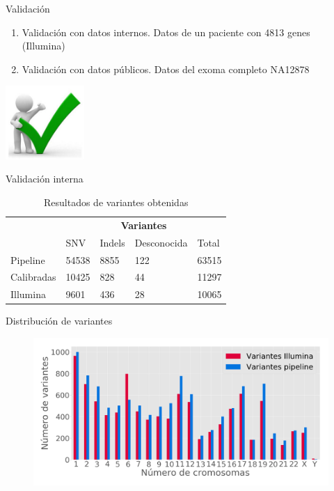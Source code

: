 \documentclass[xcolor=dvipsnames]{beamer}
\begin{document}
\begin{frame}{Validación}
	
	\begin{enumerate}[1.]
		\item Validación con datos internos. Datos de un paciente con 4813 genes (Illumina)
		\item Validación con datos públicos. Datos del exoma completo NA12878
	\end{enumerate}
	\centering
	\includegraphics[width=30mm]{validacion.png}
	
\end{frame}

\begin{frame}{Validación interna}
\begin{table}[h!]
	\centering
	\footnotesize
	\begin{table}[]
		\begin{tabular}{l|l|l|l|l|}
			\cline{2-5}
			& \multicolumn{4}{c|}{\textbf{Variantes}} \\ \cline{2-5} 
			& SNV    & Indels  & Desconocida  & Total \\ \hline
			\multicolumn{1}{|l|}{Pipeline}   & 54538  & 8855    & 122          & 63515 \\ \hline
			\multicolumn{1}{|l|}{Calibradas} & 10425  & 828     & 44           & 11297 \\ \hline
			\multicolumn{1}{|l|}{Illumina}   & 9601   & 436     & 28           & 10065 \\ \hline
		\end{tabular}
	\end{table}
	\caption{Resultados de variantes obtenidas}
\end{table}
\end{frame}

\begin{frame}{Distribución de variantes}
	\begin{figure}[]
		\centering
		\includegraphics[width=1\textwidth]{validacion1}
		\end{figure}
\end{frame}
\end{document}
